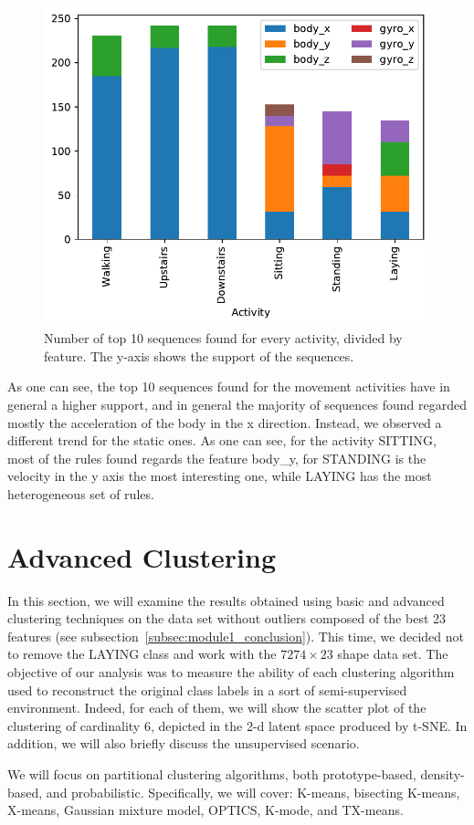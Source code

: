 \documentclass[10pt, a4paper, twocolumn]{article}
\begin{document}
\begin{figure}
    \centering
    \includegraphics[width=0.65\columnwidth]{histo_seq.pdf}
    \caption{Number of top 10 sequences found for every activity, divided by feature. The y-axis shows the support of the sequences.}
    \label{fig:histoseq}
\end{figure}

As one can see, the top 10 sequences found for the movement activities have in general a higher support, and in general the majority of sequences found regarded mostly the acceleration of the body in the x direction. Instead, we observed a different trend for the static ones. As one can see, for the activity SITTING, most of the rules found regards the feature body\_y, for STANDING is the velocity in the y axis the most interesting one, while LAYING has the most heterogeneous set of rules.  

\section{Advanced Clustering}

In this section, we will examine the results obtained using basic and advanced clustering techniques on the data set without outliers composed of the best 23 features (see subsection~\ref{subsec:module1_conclusion}). This time, we decided not to remove the LAYING class and work with the $7274 \times 23$ shape data set. The objective of our analysis was to measure the ability of each clustering algorithm used to reconstruct the original class labels in a sort of semi-supervised environment. Indeed, for each of them, we will show the scatter plot of the clustering of cardinality 6, depicted in the 2-d latent space produced by t-SNE. In addition, we will also briefly discuss the unsupervised scenario. 

We will focus on partitional clustering algorithms, both prototype-based, density-based, and probabilistic. Specifically, we will cover: K-means, bisecting K-means, X-means, Gaussian mixture model, OPTICS, K-mode, and TX-means.
\end{document}
